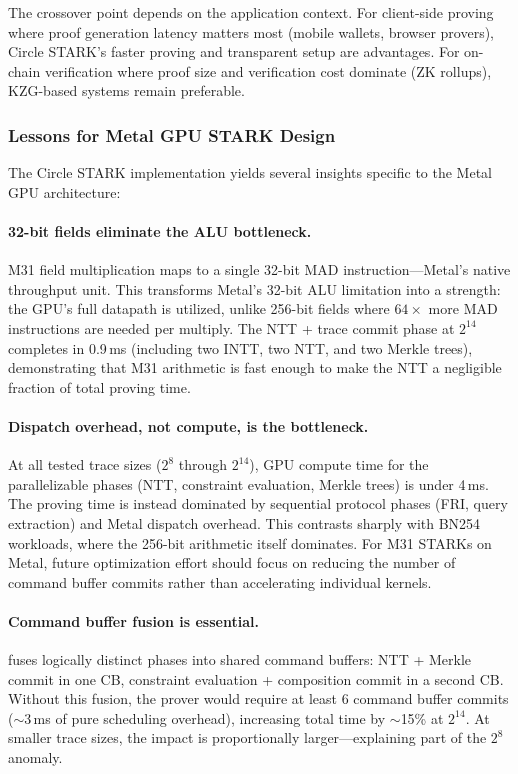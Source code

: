 The crossover point depends on the application context.  For client-side
proving where proof generation latency matters most (mobile wallets,
browser provers), Circle STARK's faster proving and transparent setup are
advantages.  For on-chain verification where proof size and verification
cost dominate (ZK rollups), KZG-based systems remain preferable.

\subsubsection{Lessons for Metal GPU STARK Design}
\label{sec:circle-lessons}

The Circle STARK implementation yields several insights specific to the
Metal GPU architecture:

\paragraph{32-bit fields eliminate the ALU bottleneck.}
M31 field multiplication maps to a single 32-bit MAD instruction---Metal's
native throughput unit.  This transforms Metal's 32-bit ALU limitation
into a strength: the GPU's full datapath is utilized, unlike 256-bit
fields where $64\times$ more MAD instructions are needed per multiply.
The NTT + trace commit phase at $2^{14}$ completes in 0.9\,ms
(including two INTT, two NTT, and two Merkle trees), demonstrating that
M31 arithmetic is fast enough to make the NTT a negligible fraction of
total proving time.

\paragraph{Dispatch overhead, not compute, is the bottleneck.}
At all tested trace sizes ($2^8$ through $2^{14}$), GPU compute time for
the parallelizable phases (NTT, constraint evaluation, Merkle trees) is
under 4\,ms.  The proving time is instead dominated by sequential protocol
phases (FRI, query extraction) and Metal dispatch overhead.  This contrasts
sharply with BN254 workloads, where the 256-bit arithmetic itself dominates.
For M31 STARKs on Metal, future optimization effort should focus on
reducing the number of command buffer commits rather than accelerating
individual kernels.

\paragraph{Command buffer fusion is essential.}
\sys fuses logically distinct phases into shared command buffers: NTT +
Merkle commit in one CB, constraint evaluation + composition commit in a
second CB.  Without this fusion, the prover would require at least 6
command buffer commits (${\sim}$3\,ms of pure scheduling overhead),
increasing total time by ${\sim}$15\% at $2^{14}$.  At smaller trace
sizes, the impact is proportionally larger---explaining part of the
$2^8$ anomaly.

